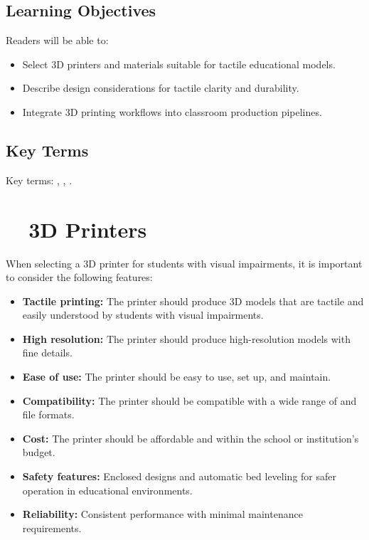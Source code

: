 \subsection{Learning Objectives}\label{chap5:learning-objectives}
Readers will be able to:
\begin{itemize}
\item Select 3D printers and materials suitable for tactile educational models.
\item Describe design considerations for tactile clarity and durability.
\item Integrate 3D printing workflows into classroom production pipelines.
\end{itemize}

\subsection{Key Terms}\label{chap5:key-terms}
Key terms: , , .

\section{~~3D Printers}\label{ch5:sec:3d-printers}
When selecting a 3D printer for students with visual impairments, it is important to consider the following features:
\begin{itemize}
	\item \textbf{Tactile printing:} The printer should produce 3D models that are tactile and easily understood by students with visual impairments.
	\item \textbf{High resolution:} The printer should produce high-resolution models with fine details.
	\item \textbf{Ease of use:} The printer should be easy to use, set up, and maintain.
	\item \textbf{Compatibility:} The printer should be compatible with a wide range of  and file formats.
	\item \textbf{Cost:} The printer should be affordable and within the school or institution's budget.
	\item \textbf{Safety features:} Enclosed designs and automatic bed leveling for safer operation in educational environments.
	\item \textbf{Reliability:} Consistent performance with minimal maintenance requirements.
\end{itemize}

